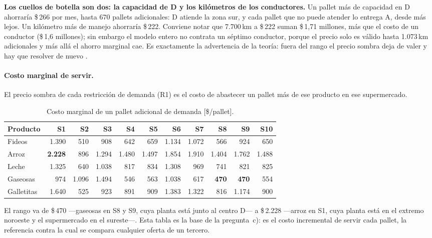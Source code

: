 \documentclass[10pt,a4paper]{article}
\begin{document}
\textbf{Los cuellos de botella son dos: la capacidad de D y los kilómetros de
los conductores.} Un pallet más de capacidad en D ahorraría \$\,266 por mes,
hasta 670 pallets adicionales: D atiende la zona sur, y cada pallet que no
puede atender lo entrega A, desde más lejos. Un
kilómetro más de manejo ahorraría \$\,222. Conviene notar que 7.700\,km a
\$\,222 suman \$\,1,71 millones, más que el costo de un conductor
(\$\,1,6 millones); sin embargo el modelo entero no contrata un séptimo
conductor, porque el precio solo es válido hasta 1.073\,km adicionales y más
allá el ahorro marginal cae. Es exactamente la advertencia de la teoría: fuera
del rango el precio sombra deja de valer y hay que resolver de nuevo
\cite{catedra-sens}.

\paragraph{Costo marginal de servir.} El precio sombra de cada restricción de
demanda (R1) es el costo de abastecer un pallet más de ese producto en ese
supermercado.

\begin{table}[H]
\centering\small
\caption{Costo marginal de un pallet adicional de demanda [\$/pallet].}
\label{tab:marginal}
\setlength{\tabcolsep}{5pt}
\begin{tabular}{lrrrrrrrrrr}
\toprule
\textbf{Producto} & \textbf{S1} & \textbf{S2} & \textbf{S3} & \textbf{S4} & \textbf{S5} & \textbf{S6} & \textbf{S7} & \textbf{S8} & \textbf{S9} & \textbf{S10} \\
\midrule
Fideos     & 1.390 & 510 & 908 & 642 & 659 & 1.134 & 1.072 & 566 & 924 & 650 \\
Arroz      & \textbf{2.228} & 896 & 1.294 & 1.480 & 1.497 & 1.854 & 1.910 & 1.404 & 1.762 & 1.488 \\
Leche      & 1.325 & 640 & 1.038 & 817 & 834 & 1.308 & 969 & 741 & 821 & 825 \\
Gaseosas   & 974 & 1.096 & 1.494 & 546 & 563 & 1.038 & 617 & \textbf{470} & \textbf{470} & 554 \\
Galletitas & 1.640 & 525 & 923 & 891 & 909 & 1.383 & 1.322 & 816 & 1.174 & 900 \\
\bottomrule
\end{tabular}
\end{table}

El rango va de \$\,470 —gaseosas en S8 y S9, cuya planta está junto al
centro D— a \$\,2.228 —arroz en S1, cuya planta está en el extremo noroeste y
el supermercado en el sureste—. Esta tabla es la base de la pregunta~c): es el
costo incremental de servir cada pallet, la referencia contra la cual se
compara cualquier oferta de un tercero.
\end{document}
